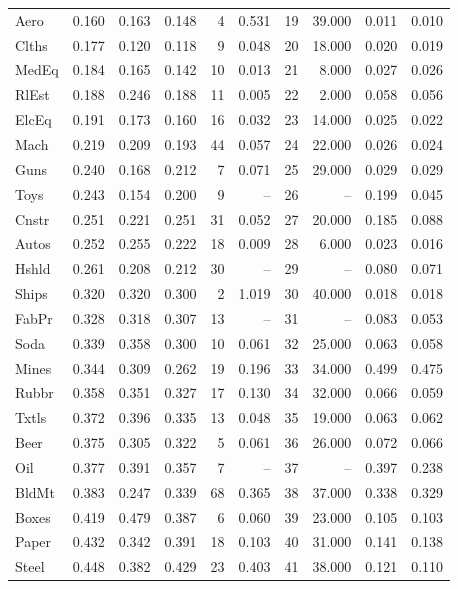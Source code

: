 \begin{table}
\begin{tabular}{lrrrrrrrrr}
Aero & 0.160 & 0.163 & 0.148 & 4 & 0.531 & 19 & 39.000 & 0.011 & 0.010 \\
Clths & 0.177 & 0.120 & 0.118 & 9 & 0.048 & 20 & 18.000 & 0.020 & 0.019 \\
MedEq & 0.184 & 0.165 & 0.142 & 10 & 0.013 & 21 & 8.000 & 0.027 & 0.026 \\
RlEst & 0.188 & 0.246 & 0.188 & 11 & 0.005 & 22 & 2.000 & 0.058 & 0.056 \\
ElcEq & 0.191 & 0.173 & 0.160 & 16 & 0.032 & 23 & 14.000 & 0.025 & 0.022 \\
Mach & 0.219 & 0.209 & 0.193 & 44 & 0.057 & 24 & 22.000 & 0.026 & 0.024 \\
Guns & 0.240 & 0.168 & 0.212 & 7 & 0.071 & 25 & 29.000 & 0.029 & 0.029 \\
Toys & 0.243 & 0.154 & 0.200 & 9 & -- & 26 & -- & 0.199 & 0.045 \\
Cnstr & 0.251 & 0.221 & 0.251 & 31 & 0.052 & 27 & 20.000 & 0.185 & 0.088 \\
Autos & 0.252 & 0.255 & 0.222 & 18 & 0.009 & 28 & 6.000 & 0.023 & 0.016 \\
Hshld & 0.261 & 0.208 & 0.212 & 30 & -- & 29 & -- & 0.080 & 0.071 \\
Ships & 0.320 & 0.320 & 0.300 & 2 & 1.019 & 30 & 40.000 & 0.018 & 0.018 \\
FabPr & 0.328 & 0.318 & 0.307 & 13 & -- & 31 & -- & 0.083 & 0.053 \\
Soda & 0.339 & 0.358 & 0.300 & 10 & 0.061 & 32 & 25.000 & 0.063 & 0.058 \\
Mines & 0.344 & 0.309 & 0.262 & 19 & 0.196 & 33 & 34.000 & 0.499 & 0.475 \\
Rubbr & 0.358 & 0.351 & 0.327 & 17 & 0.130 & 34 & 32.000 & 0.066 & 0.059 \\
Txtls & 0.372 & 0.396 & 0.335 & 13 & 0.048 & 35 & 19.000 & 0.063 & 0.062 \\
Beer & 0.375 & 0.305 & 0.322 & 5 & 0.061 & 36 & 26.000 & 0.072 & 0.066 \\
Oil & 0.377 & 0.391 & 0.357 & 7 & -- & 37 & -- & 0.397 & 0.238 \\
BldMt & 0.383 & 0.247 & 0.339 & 68 & 0.365 & 38 & 37.000 & 0.338 & 0.329 \\
Boxes & 0.419 & 0.479 & 0.387 & 6 & 0.060 & 39 & 23.000 & 0.105 & 0.103 \\
Paper & 0.432 & 0.342 & 0.391 & 18 & 0.103 & 40 & 31.000 & 0.141 & 0.138 \\
Steel & 0.448 & 0.382 & 0.429 & 23 & 0.403 & 41 & 38.000 & 0.121 & 0.110 \\

\end{tabular}
\end{table}
